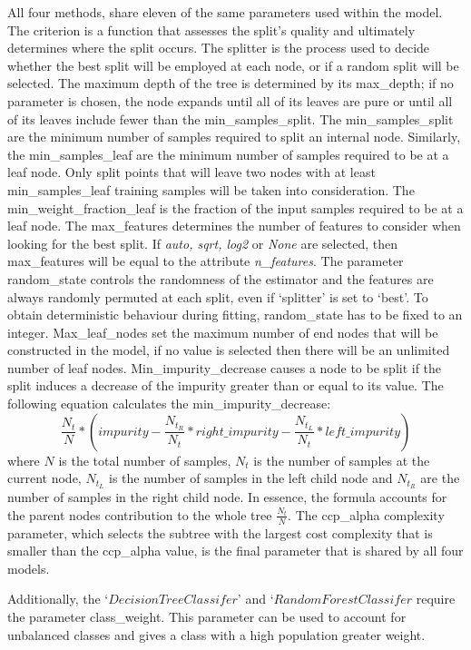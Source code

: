\documentclass[../thesis.tex]{subfiles}
\begin{document}
All four methods, share eleven of the same parameters used within the model. The criterion is a function that assesses the split's quality and ultimately determines where the split occurs. The splitter is the process used to decide whether the best split will be employed at each node, or if a random split will be selected. The maximum depth of the tree is determined by its max\_depth; if no parameter is chosen, the node expands until all of its leaves are pure or until all of its leaves include fewer than the min\_samples\_split. The min\_samples\_split are the minimum number of samples required to split an internal node. Similarly, the min\_samples\_leaf are the minimum number of samples required to be at a leaf node. Only split points that will leave two nodes with at least min\_samples\_leaf training samples will be taken into consideration. The min\_weight\_fraction\_leaf is the fraction of the input samples required to be at a leaf node. The max\_features determines the number of features to consider when looking for the best split. If \textit{auto, sqrt, log2} or \textit{None} are selected, then max\_features will be equal to the attribute \textit{n\_features}. The parameter random\_state controls the randomness of the estimator and the features are always randomly permuted at each split, even if `splitter' is set to `best'. To obtain deterministic behaviour during fitting, random\_state has to be fixed to an integer. Max\_leaf\_nodes set the maximum number of end nodes that will be constructed in the model, if no value is selected then there will be an unlimited number of leaf nodes. Min\_impurity\_decrease causes a node to be split if the split induces a decrease of the impurity greater than or equal to its value. The following equation calculates the min\_impurity\_decrease:
\begin{equation}
    \frac{N_t}{N} * (impurity - \frac{N_{t_R}}{N_t} * right\_impurity -\frac{N_{t_L}}{N_t} * left\_impurity)
\end{equation}
where $N$ is the total number of samples, $N_t$ is the number of samples at the current node, $N_{t_L}$ is the number of samples in the left child node and $N_{t_R}$ are the number of samples in the right child node. In essence, the formula accounts for the parent nodes contribution to the whole tree $\frac{N_t}{N}$. The ccp\_alpha complexity parameter, which selects the subtree with the largest cost complexity that is smaller than the ccp\_alpha value, is the final parameter that is shared by all four models.

Additionally, the `$DecisionTreeClassifer$' and `$RandomForestClassifer$ require the parameter class\_weight. This parameter can be used to account for unbalanced classes and gives a class with a high population greater weight.
\end{document}
